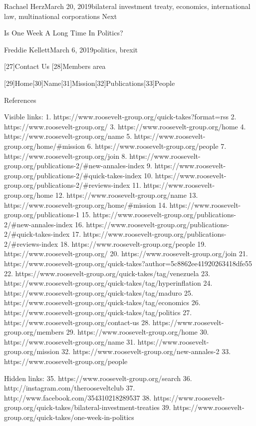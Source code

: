    Rachael HerzMarch 20, 2019bilateral investment treaty, economics,
   international law, multinational corporations
   Next

Is One Week A Long Time In Politics?

   Freddie KellettMarch 6, 2019politics, brexit

   [27]Contact Us
   [28]Members area

   [29]Home[30]Name[31]Mission[32]Publications[33]People

References

   Visible links:
   1. https://www.roosevelt-group.org/quick-takes?format=rss
   2. https://www.roosevelt-group.org/
   3. https://www.roosevelt-group.org/home
   4. https://www.roosevelt-group.org/name
   5. https://www.roosevelt-group.org/home/#mission
   6. https://www.roosevelt-group.org/people
   7. https://www.roosevelt-group.org/join
   8. https://www.roosevelt-group.org/publications-2/#new-annales-index
   9. https://www.roosevelt-group.org/publications-2/#quick-takes-index
  10. https://www.roosevelt-group.org/publications-2/#reviews-index
  11. https://www.roosevelt-group.org/home
  12. https://www.roosevelt-group.org/name
  13. https://www.roosevelt-group.org/home/#mission
  14. https://www.roosevelt-group.org/publications-1
  15. https://www.roosevelt-group.org/publications-2/#new-annales-index
  16. https://www.roosevelt-group.org/publications-2/#quick-takes-index
  17. https://www.roosevelt-group.org/publications-2/#reviews-index
  18. https://www.roosevelt-group.org/people
  19. https://www.roosevelt-group.org/
  20. https://www.roosevelt-group.org/join
  21. https://www.roosevelt-group.org/quick-takes?author=5c8862ee41920263418dfe55
  22. https://www.roosevelt-group.org/quick-takes/tag/venezuela
  23. https://www.roosevelt-group.org/quick-takes/tag/hyperinflation
  24. https://www.roosevelt-group.org/quick-takes/tag/maduro
  25. https://www.roosevelt-group.org/quick-takes/tag/economics
  26. https://www.roosevelt-group.org/quick-takes/tag/politics
  27. https://www.roosevelt-group.org/contact-us
  28. https://www.roosevelt-group.org/members
  29. https://www.roosevelt-group.org/home
  30. https://www.roosevelt-group.org/name
  31. https://www.roosevelt-group.org/mission
  32. https://www.roosevelt-group.org/new-annales-2
  33. https://www.roosevelt-group.org/people

   Hidden links:
  35. https://www.roosevelt-group.org/search
  36. http://instagram.com/therooseveltclub
  37. http://www.facebook.com/354310218289537
  38. https://www.roosevelt-group.org/quick-takes/bilateral-investment-treaties
  39. https://www.roosevelt-group.org/quick-takes/one-week-in-politics
